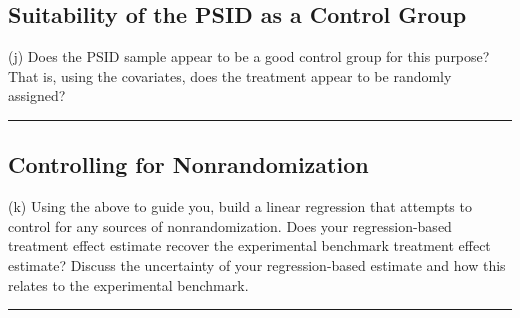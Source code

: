 \documentclass{article}
\newenvironment{colorparagraph}[1]{\par\color{#1}}{\par}
\begin{document}
\begin{colorparagraph}{questioncolor}
\label{q4j}\subsection{Suitability of the PSID as a Control Group}
(j) Does the PSID sample appear to be a good control group for this purpose? That is, using the covariates, does the treatment appear to be randomly assigned?

\rule{\textwidth}{0.5pt}
\end{colorparagraph}

\begin{colorparagraph}{questioncolor}
\label{q4k}\subsection{Controlling for Nonrandomization}
(k) Using the above to guide you, build a linear regression that attempts to control for any sources of nonrandomization. Does your regression-based treatment effect estimate recover the experimental benchmark treatment effect estimate? Discuss the uncertainty of your regression-based estimate and how this relates to the experimental benchmark.

\rule{\textwidth}{0.5pt}
\end{colorparagraph}
\end{document}
